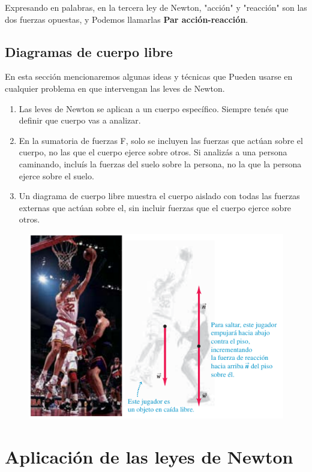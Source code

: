 \documentclass{article}
\newcommand{\newsection}[1]{
    \vspace{0.5cm}
    {\color{sectionColor}
    \centering
    \section{\bl{#1}}}
    \color{black}
    \vspace{0.5cm}
}
\newcommand{\newsubsection}[1]{
    \vspace{0.5cm}
    \color{sectionColor}
    \subsection{ #1}
    \color{black}
    \vspace{0.5cm}
}
\newcommand{\bl}[1]{\textbf{#1}}
\begin{document}
    \par Expresando en palabras, en la tercera ley de Newton, "acción" y "reacción" son las dos fuerzas opuestas, y Podemos llamarlas \bl{Par acción-reacción}.

    \newsubsection{Diagramas de cuerpo libre}

    \par En esta sección mencionaremos algunas ideas y técnicas que Pueden usarse en cualquier problema en que intervengan las leves de Newton.

    \begin{enumerate}
        \item Las leves de Newton se aplican a un cuerpo específico. Siempre tenés que definir que cuerpo vas a analizar.
        \item En la sumatoria de fuerzas F, solo se incluyen las fuerzas que actúan sobre el cuerpo, no las que el cuerpo ejerce sobre otros. Si analizás a una persona caminando, incluís la fuerzas del suelo sobre la persona, no la que la persona ejerce sobre el suelo.
        \item Un diagrama de cuerpo libre muestra el cuerpo aislado con todas las fuerzas externas que actúan sobre el, sin incluir fuerzas que el cuerpo ejerce sobre otros.
    \end{enumerate}

    \begin{figure}[H]
        \centering
        \includegraphics[scale=0.7]{img/2.6-1.png}
    \end{figure}

\newsection{Aplicación de las leyes de Newton}
\end{document}
